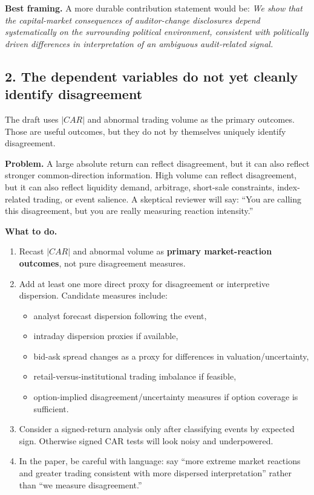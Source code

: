 \documentclass[12pt]{article}
\begin{document}
\textbf{Best framing.} A more durable contribution statement would be: \emph{We show that the capital-market consequences of auditor-change disclosures depend systematically on the surrounding political environment, consistent with politically driven differences in interpretation of an ambiguous audit-related signal.}

\subsection{2. The dependent variables do not yet cleanly identify disagreement}
The draft uses $|CAR|$ and abnormal trading volume as the primary outcomes. Those are useful outcomes, but they do not by themselves uniquely identify disagreement.

\textbf{Problem.} A large absolute return can reflect disagreement, but it can also reflect stronger common-direction information. High volume can reflect disagreement, but it can also reflect liquidity demand, arbitrage, short-sale constraints, index-related trading, or event salience. A skeptical reviewer will say: ``You are calling this disagreement, but you are really measuring reaction intensity.''

\textbf{What to do.}
\begin{enumerate}[leftmargin=2em]
    \item Recast $|CAR|$ and abnormal volume as \textbf{primary market-reaction outcomes}, not pure disagreement measures.
    \item Add at least one more direct proxy for disagreement or interpretive dispersion. Candidate measures include:
    \begin{itemize}[leftmargin=2em]
        \item analyst forecast dispersion following the event,
        \item intraday dispersion proxies if available,
        \item bid-ask spread changes as a proxy for differences in valuation/uncertainty,
        \item retail-versus-institutional trading imbalance if feasible,
        \item option-implied disagreement/uncertainty measures if option coverage is sufficient.
    \end{itemize}
    \item Consider a signed-return analysis only after classifying events by expected sign. Otherwise signed CAR tests will look noisy and underpowered.
    \item In the paper, be careful with language: say ``more extreme market reactions and greater trading consistent with more dispersed interpretation'' rather than ``we measure disagreement.''
\end{enumerate}
\end{document}
